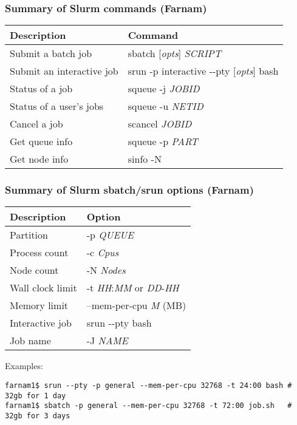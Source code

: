 \documentclass[10pt]{beamer}
\newcommand\smallfont{\fontsize{8pt}{7.2}\selectfont}
\begin{document}
\begin{frame}
\frametitle{Summary of Slurm commands (Farnam)}
\begin{tabular}{|l|l|}
\hline
\textbf{Description} & \textbf{Command} \\
\hline
Submit a batch job & sbatch [\textit{opts}] \textit{SCRIPT} \\
\hline
Submit an interactive job & srun -p interactive -{}-pty [\textit{opts}] bash  \\
\hline
Status of a job & squeue -j \textit{JOBID} \\
\hline
Status of a user's jobs & squeue -u \textit{NETID} \\
\hline
Cancel a job & scancel \textit{JOBID} \\
\hline
Get queue info & squeue -p \textit{PART} \\
\hline
Get node info & sinfo -N \\
\hline
\end{tabular}
\end{frame}

\begin{frame}[fragile]
\frametitle{Summary of Slurm sbatch/srun options (Farnam)}
\begin{tabular}{|l|l|}
\hline
\textbf{Description} & \textbf{Option} \\
\hline
Partition & -p \textit{QUEUE} \\
\hline
Process count & -c \textit{Cpus} \\
\hline
Node count & -N \textit{Nodes} \\
\hline
Wall clock limit & -t \textit{HH}:\textit{MM} or \textit{DD}-\textit{HH}\\
\hline
Memory limit & --mem-per-cpu \textit{M} (MB)\\
\hline
Interactive job & srun -{}-pty bash \\
\hline
Job name & -J \textit{NAME} \\
\hline
\end{tabular}

\vskip10pt
Examples:
\smallfont
\begin{verbatim}
farnam1$ srun --pty -p general --mem-per-cpu 32768 -t 24:00 bash # 32gb for 1 day
farnam1$ sbatch -p general --mem-per-cpu 32768 -t 72:00 job.sh   # 32gb for 3 days
\end{verbatim}
\end{frame}
\end{document}
